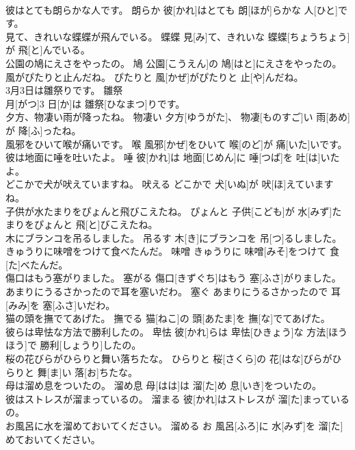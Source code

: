 \documentclass[8pt]{extreport}
\begin{document}
\begin{CJK}{UTF8}{min}
\\	彼はとても朗らかな人です。	朗らか	彼[かれ]はとても 朗[ほが]らかな 人[ひと]です。	
\\	見て、きれいな蝶蝶が飛んでいる。	蝶蝶	見[み]て、きれいな 蝶蝶[ちょうちょう]が 飛[と]んでいる。	
\\	公園の鳩にえさをやったの。	鳩	公園[こうえん]の 鳩[はと]にえさをやったの。	
\\	風がぴたりと止んだね。	ぴたりと	風[かぜ]がぴたりと 止[や]んだね。	
\\	3月3日は雛祭りです。	雛祭	
\\	月[がつ]3 日[か]は 雛祭[ひなまつ]りです。	
\\	夕方、物凄い雨が降ったね。	物凄い	夕方[ゆうがた]、 物凄[ものすご]い 雨[あめ]が 降[ふ]ったね。	
\\	風邪をひいて喉が痛いです。	喉	風邪[かぜ]をひいて 喉[のど]が 痛[いた]いです。	
\\	彼は地面に唾を吐いたよ。	唾	彼[かれ]は 地面[じめん]に 唾[つば]を 吐[は]いたよ。	
\\	どこかで犬が吠えていますね。	吠える	どこかで 犬[いぬ]が 吠[ほ]えていますね。	
\\	子供が水たまりをぴょんと飛びこえたね。	ぴょんと	子供[こども]が 水[みず]たまりをぴょんと 飛[と]びこえたね。	
\\	木にブランコを吊るしました。	吊るす	木[き]にブランコを 吊[つ]るしました。	
\\	きゅうりに味噌をつけて食べたんだ。	味噌	きゅうりに 味噌[みそ]をつけて 食[た]べたんだ。	
\\	傷口はもう塞がりました。	塞がる	傷口[きずぐち]はもう 塞[ふさ]がりました。	
\\	あまりにうるさかったので耳を塞いだわ。	塞ぐ	あまりにうるさかったので 耳[みみ]を 塞[ふさ]いだわ。	
\\	猫の頭を撫でてあげた。	撫でる	猫[ねこ]の 頭[あたま]を 撫[な]でてあげた。	
\\	彼らは卑怯な方法で勝利したの。	卑怯	彼[かれ]らは 卑怯[ひきょう]な 方法[ほうほう]で 勝利[しょうり]したの。	
\\	桜の花びらがひらりと舞い落ちたな。	ひらりと	桜[さくら]の 花[はな]びらがひらりと 舞[ま]い 落[お]ちたな。	
\\	母は溜め息をついたの。	溜め息	母[はは]は 溜[た]め 息[いき]をついたの。	
\\	彼はストレスが溜まっているの。	溜まる	彼[かれ]はストレスが 溜[た]まっているの。	
\\	お風呂に水を溜めておいてください。	溜める	お 風呂[ふろ]に 水[みず]を 溜[た]めておいてください。	

\end{CJK}
\end{document}
